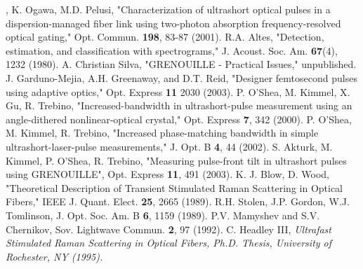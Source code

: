 \begin{thebibliography}{99}
, K. Ogawa, M.D. Pelusi, "Characterization of ultrashort optical pulses in a dispersion-managed fiber link using two-photon absorption frequency-resolved optical gating," Opt. Commun. \textbf{198}, 83-87 (2001).
 R.A. Altes, "Detection, estimation, and classification
with spectrograms," J. Acoust. Soc. Am. \textbf{67}(4), 1232 (1980).
 A. Christian Silva, "GRENOUILLE - Practical Issues," unpublished.
 J. Garduno-Mejia, A.H. Greenaway, and D.T. Reid, "Designer
femtosecond pulses using adaptive optics," Opt. Express \textbf{11}
2030 (2003).
 P. O'Shea, M. Kimmel, X. Gu, R. Trebino, "Increased-bandwidth in ultrashort-pulse measurement using an angle-dithered nonlinear-optical crystal," Opt. Express \textbf{7}, 342 (2000).
 P. O'Shea, M. Kimmel, R. Trebino, "Increased phase-matching bandwidth in simple ultrashort-laser-pulse measurements," J. Opt. B \textbf{4}, 44 (2002).
 S. Akturk, M. Kimmel, P. O'Shea, R. Trebino, "Measuring pulse-front tilt in ultrashort pulses using GRENOUILLE", Opt. Express \textbf{11}, 491 (2003).
 K. J. Blow, D. Wood, "Theoretical Description of Transient Stimulated Raman Scattering in Optical Fibers," IEEE J. Quant. Elect. \textbf{25}, 2665 (1989).
 R.H. Stolen, J.P. Gordon, W.J. Tomlinson,
J. Opt. Soc. Am. B \textbf{6}, 1159 (1989).
 P.V. Mamyshev and S.V. Chernikov, Sov. Lightwave
Commun. \textbf{2}, 97 (1992).
 C. Headley III, \em{Ultrafast Stimulated Raman
Scattering in Optical Fibers}, Ph.D. Thesis, University of Rochester,
NY (1995).
\end{thebibliography}
